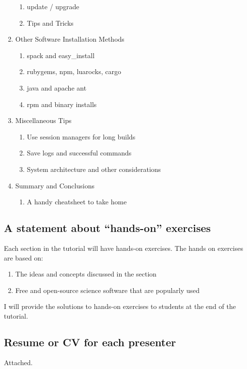 \documentclass{report}
\begin{document}
\begin{enumerate}
\begin{enumerate}
    \item update / upgrade
    \item Tips and Tricks
  \end{enumerate}
\item Other Software Installation Methods
    \begin{enumerate}
        \item spack and easy\_install
        \item rubygems, npm, luarocks, cargo
        \item java and apache ant 
        \item rpm and binary installs
    \end{enumerate}
\item Miscellaneous Tips
  \begin{enumerate}
    \item Use session managers for long builds
    \item Save logs and successful commands
    \item System architecture and other considerations
  \end{enumerate}
\item Summary and Conclusions
  \begin{enumerate}
    \item A handy cheatsheet to take home
  \end{enumerate}
\end{enumerate}

\subsection*{A statement about ``hands-on'' exercises}
Each section in the tutorial will have hands-on exercises. The hands on exercises are based on:
\begin{enumerate}
\item The ideas and concepts discussed in the section 
\item Free and open-source science software that are popularly used
\end{enumerate}
I will provide the solutions to hands-on exercises to students at the end of the tutorial.

\subsection*{Resume or CV for each presenter}
Attached.
\end{document}

